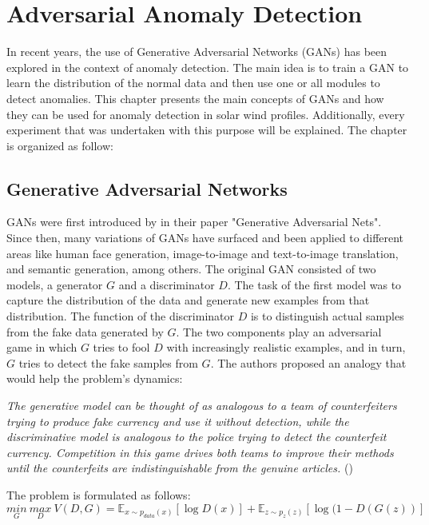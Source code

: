\chapter{Adversarial Anomaly Detection}\label{chap:aad}
In recent years, the use of Generative Adversarial Networks (GANs) has been explored in the context of anomaly detection. The main idea is to train a GAN to learn the distribution of the normal data and then use one or all modules to detect anomalies. This chapter presents the main concepts of GANs and how they can be used for anomaly detection in solar wind profiles. Additionally, every experiment that was undertaken with this purpose will be explained. The chapter is organized as follow:

\section{Generative Adversarial Networks}\label{sec:gan_background}
GANs were first introduced by \cite{goodfellow.etal_GenerativeAdversarialNets_} in their paper "Generative Adversarial Nets". Since then, many variations of GANs have surfaced and been applied to different areas like human face generation, image-to-image and text-to-image translation, and semantic generation, among others. The original GAN consisted of two models, a generator $G$ and a discriminator $D$. The task of the first model was to capture the distribution of the data and generate new examples from that distribution. The function of the discriminator $D$ is to distinguish actual samples from the fake data generated by $G$. The two components play an adversarial game in which $G$ tries to fool $D$ with increasingly realistic examples, and in turn, $G$ tries to detect the fake samples from $G$. The authors proposed an analogy that would help the problem's dynamics:

\noindent\textit{The generative model can be thought of as analogous to a team of counterfeiters trying to produce fake currency and use it without detection, while the discriminative model is analogous to the police trying to detect the counterfeit currency. Competition in this game drives both teams to improve their methods until the counterfeits are indistinguishable from the genuine articles.} (\cite{goodfellow.etal_GenerativeAdversarialNets_})

The problem is formulated as follows:
\begin{equation}
    \underset{G}{min}\ \underset{D}{max}\ V(D,G) = \mathbb{E}_{x \sim p_{data}(x)}[\log D(x)] + \mathbb{E}_{z \sim p_z(z)}[\log(1 - D(G(z))]
    \label{eq:gan_min_max}
 \end{equation}

